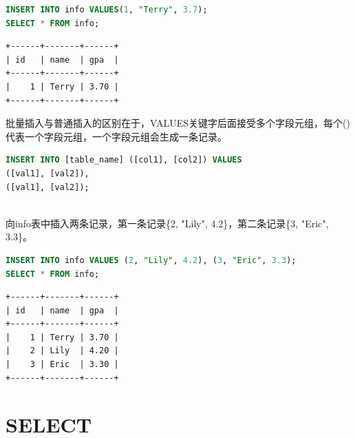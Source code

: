 \documentclass[12pt, openany, oneside]{book}
\begin{document}
\begin{lstlisting}[language=SQL]
INSERT INTO info VALUES(1, "Terry", 3.7);
SELECT * FROM info;
\end{lstlisting}

\begin{tcolorbox}
	\begin{verbatim}
+------+-------+------+
| id   | name  | gpa  |
+------+-------+------+
|    1 | Terry | 3.70 |
+------+-------+------+
\end{verbatim}
\end{tcolorbox}

批量插入与普通插入的区别在于，VALUES关键字后面接受多个字段元组，每个()代表一个字段元组，一个字段元组会生成一条记录。

\vspace{-0.5cm}

\begin{lstlisting}[language=SQL]
INSERT INTO [table_name] ([col1], [col2]) VALUES
([val1], [val2]),
([val1], [val2]);
\end{lstlisting}

\vspace{0.5cm}

\\

向info表中插入两条记录，第一条记录\{2, "Lily", 4.2\}，第二条记录\{3, "Eric", 3.3\}。

\vspace{-0.5cm}

\begin{lstlisting}[language=SQL]
INSERT INTO info VALUES (2, "Lily", 4.2), (3, "Eric", 3.3);
SELECT * FROM info;
\end{lstlisting}

\begin{tcolorbox}
	\begin{verbatim}
+------+-------+------+
| id   | name  | gpa  |
+------+-------+------+
|    1 | Terry | 3.70 |
|    2 | Lily  | 4.20 |
|    3 | Eric  | 3.30 |
+------+-------+------+
\end{verbatim}
\end{tcolorbox}

\newpage

\chapter{SELECT}

\vspace{0.5cm}
\end{document}
